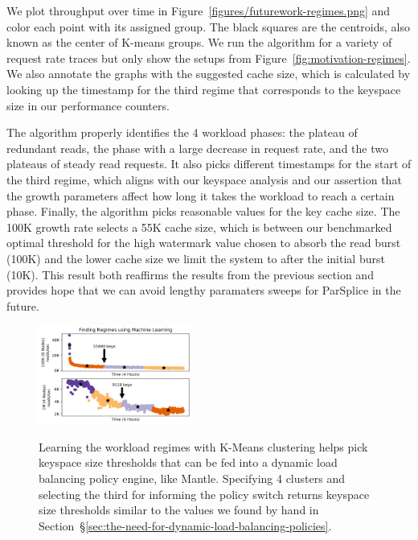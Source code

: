 We plot throughput over time in Figure~\ref{figures/futurework-regimes.png} and
color each point with its assigned group. The black squares are the centroids,
also known as the center of K-means groups.  We run the algorithm for a variety
of request rate traces but only show the setups from
Figure~\ref{fig:motivation-regimes}. We also annotate the graphs with the
suggested cache size, which is calculated by looking up the timestamp for the
third regime that corresponds to the keyspace size in our performance counters.

The algorithm properly identifies the 4 workload phases: the plateau of
redundant reads, the phase with a large decrease in request rate, and the two
plateaus of steady read requests. It also picks different timestamps for the
start of the third regime, which aligns with our keyspace analysis and our
assertion that the growth parameters affect how long it takes the workload to
reach a certain phase.  Finally, the algorithm picks reasonable values for the
key cache size. The 100K growth rate selects a 55K cache size, which is between
our benchmarked optimal threshold for the high watermark value chosen to
absorb the read burst (100K) and the lower cache size we limit the system to
after the initial burst (10K). This result both reaffirms the results from the
previous section and provides hope that we can avoid lengthy paramaters sweeps
for ParSplice in the future.

\begin{figure}[tbh]
\noindent\includegraphics[width=0.45\textwidth]{figures/futurework-regimes.png}\\
  \caption{Learning the workload regimes with K-Means clustering helps pick
  keyspace size thresholds that can be fed into a dynamic load balancing policy
  engine, like Mantle. Specifying 4 clusters and selecting the third for
  informing the policy switch returns keyspace size thresholds similar to the
  values we found by hand in
  Section~\S\ref{sec:the-need-for-dynamic-load-balancing-policies}.
\label{fig:futurework-regimes}}
\end{figure}
